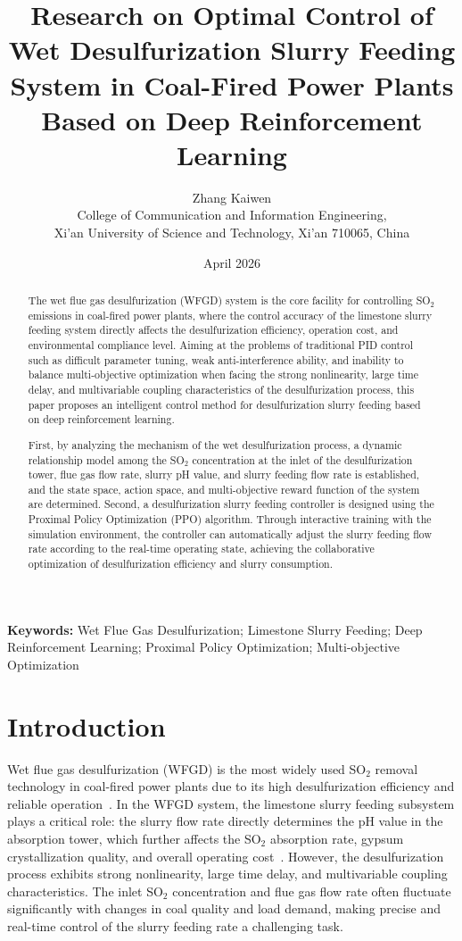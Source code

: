 \documentclass[12pt,a4paper]{article}
\title{Research on Optimal Control of Wet Desulfurization Slurry Feeding System in Coal-Fired Power Plants Based on Deep Reinforcement Learning}
\author{Zhang Kaiwen \\
College of Communication and Information Engineering, \\
Xi'an University of Science and Technology, Xi'an 710065, China}
\date{April 2026}
\begin{document}
\maketitle

\begin{abstract}
The wet flue gas desulfurization (WFGD) system is the core facility for controlling SO\(_2\) emissions in coal-fired power plants, where the control accuracy of the limestone slurry feeding system directly affects the desulfurization efficiency, operation cost, and environmental compliance level. Aiming at the problems of traditional PID control such as difficult parameter tuning, weak anti-interference ability, and inability to balance multi-objective optimization when facing the strong nonlinearity, large time delay, and multivariable coupling characteristics of the desulfurization process, this paper proposes an intelligent control method for desulfurization slurry feeding based on deep reinforcement learning.

First, by analyzing the mechanism of the wet desulfurization process, a dynamic relationship model among the SO\(_2\) concentration at the inlet of the desulfurization tower, flue gas flow rate, slurry pH value, and slurry feeding flow rate is established, and the state space, action space, and multi-objective reward function of the system are determined. Second, a desulfurization slurry feeding controller is designed using the Proximal Policy Optimization (PPO) algorithm. Through interactive training with the simulation environment, the controller can automatically adjust the slurry feeding flow rate according to the real-time operating state, achieving the collaborative optimization of desulfurization efficiency and slurry consumption.
\end{abstract}

\noindent\textbf{Keywords:} Wet Flue Gas Desulfurization; Limestone Slurry Feeding; Deep Reinforcement Learning; Proximal Policy Optimization; Multi-objective Optimization

\section{Introduction}

Wet flue gas desulfurization (WFGD) is the most widely used SO\(_2\) removal technology in coal-fired power plants due to its high desulfurization efficiency and reliable operation~\cite{srivastava2001}. In the WFGD system, the limestone slurry feeding subsystem plays a critical role: the slurry flow rate directly determines the pH value in the absorption tower, which further affects the SO\(_2\) absorption rate, gypsum crystallization quality, and overall operating cost~\cite{zheng2017}. However, the desulfurization process exhibits strong nonlinearity, large time delay, and multivariable coupling characteristics. The inlet SO\(_2\) concentration and flue gas flow rate often fluctuate significantly with changes in coal quality and load demand, making precise and real-time control of the slurry feeding rate a challenging task.
\end{document}
